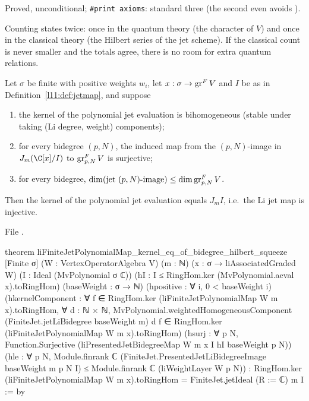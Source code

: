 \begin{status}
Proved, unconditional; \texttt{\#print axioms}: standard three (the second even avoids ).
\end{status}

\begin{physics}
Counting states twice: once in the quantum theory (the character of $V$) and once in the classical theory (the
Hilbert series of the jet scheme). If the classical count is never smaller and the totals agree, there is no room
for extra quantum relations.
\end{physics}

\begin{theorem}\label{l11:thm:freeness}
Let $\sigma$ be finite with positive weights $w_i$, let $x:\sigma\to\operatorname{gr}^FV$ and $I$ be as in
Definition~\ref{l11:def:jetmap}, and suppose
\begin{enumerate}
\item the kernel of the polynomial jet evaluation is bihomogeneous (stable under taking (Li degree, weight)
  components);
\item for every bidegree $(p,N)$, the induced map from the $(p,N)$-image in $J_m(\C[x]/I)$ to
  $\operatorname{gr}^F_{p,N}V$ is surjective;
\item for every bidegree, $\dim(\text{jet }(p,N)\text{-image})\le\dim\operatorname{gr}^F_{p,N}V$.
\end{enumerate}
Then the kernel of the polynomial jet evaluation equals $J_mI$, i.e.\ the Li jet map is injective.
\end{theorem}
\noindent File .
\begin{leancode}
theorem liFiniteJetPolynomialMap_kernel_eq_of_bidegree_hilbert_squeeze
    [Finite σ]
    (W : VertexOperatorAlgebra V) (m : ℕ)
    (x : σ → liAssociatedGraded W) (I : Ideal (MvPolynomial σ ℂ))
    (hI : I ≤ RingHom.ker (MvPolynomial.aeval x).toRingHom)
    (baseWeight : σ → ℕ) (hpositive : ∀ i, 0 < baseWeight i)
    (hkernelComponent :
      ∀ f ∈ RingHom.ker (liFiniteJetPolynomialMap W m x).toRingHom,
        ∀ d : ℕ × ℕ,
          MvPolynomial.weightedHomogeneousComponent
              (FiniteJet.jetLiBidegree baseWeight m) d f ∈
            RingHom.ker (liFiniteJetPolynomialMap W m x).toRingHom)
    (hsurj : ∀ p N, Function.Surjective
      (liPresentedJetBidegreeMap W m x I hI baseWeight p N))
    (hle : ∀ p N,
      Module.finrank ℂ
          (FiniteJet.PresentedJetLiBidegreeImage baseWeight m p N I) ≤
        Module.finrank ℂ (liWeightLayer W p N)) :
    RingHom.ker (liFiniteJetPolynomialMap W m x).toRingHom =
      FiniteJet.jetIdeal (R := ℂ) m I := by
\end{leancode}

